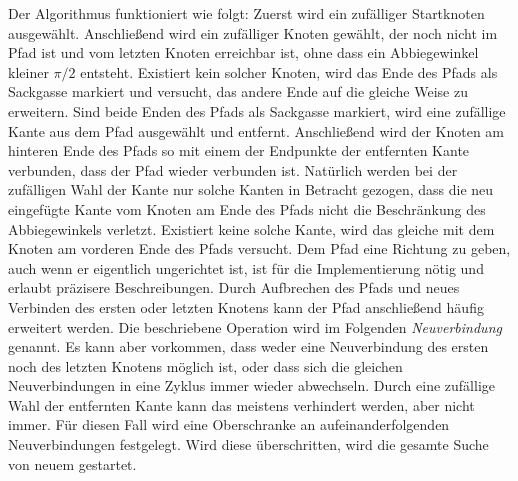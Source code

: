 \documentclass[a4paper, 10pt, ngerman]{article}
\begin{document}
Der Algorithmus funktioniert wie folgt: Zuerst wird ein zufälliger Startknoten ausgewählt. Anschließend wird ein zufälliger Knoten gewählt, der noch nicht im Pfad ist und vom letzten Knoten erreichbar ist, ohne dass ein Abbiegewinkel kleiner $\pi / 2$ entsteht. Existiert kein solcher Knoten, wird das Ende des Pfads als Sackgasse markiert und versucht, das andere Ende auf die gleiche Weise zu erweitern. Sind beide Enden des Pfads als Sackgasse markiert, wird eine zufällige Kante aus dem Pfad ausgewählt und entfernt. Anschließend wird der Knoten am hinteren Ende des Pfads so mit einem der Endpunkte der entfernten Kante verbunden, dass der Pfad wieder verbunden ist. Natürlich werden bei der zufälligen Wahl der Kante nur solche Kanten in Betracht gezogen, dass die neu eingefügte Kante vom Knoten am Ende des Pfads nicht die Beschränkung des Abbiegewinkels verletzt. Existiert keine solche Kante, wird das gleiche mit dem Knoten am vorderen Ende des Pfads versucht. Dem Pfad eine Richtung zu geben, auch wenn er eigentlich ungerichtet ist, ist für die Implementierung nötig und erlaubt präzisere Beschreibungen. Durch Aufbrechen des Pfads und neues Verbinden des ersten oder letzten Knotens kann der Pfad anschließend häufig erweitert werden. Die beschriebene Operation wird im Folgenden \emph{Neuverbindung} genannt. Es kann aber vorkommen, dass weder eine Neuverbindung des ersten noch des letzten Knotens möglich ist, oder dass sich die gleichen Neuverbindungen in eine Zyklus immer wieder abwechseln. Durch eine zufällige Wahl der entfernten Kante kann das meistens verhindert werden, aber nicht immer. Für diesen Fall wird eine Oberschranke an aufeinanderfolgenden Neuverbindungen festgelegt. Wird diese überschritten, wird die gesamte Suche von neuem gestartet.
\end{document}
